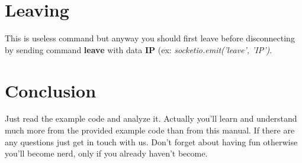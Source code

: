 \documentclass[10pt]{article}
\begin{document}
\section{Leaving}
This is useless command but anyway you should first leave before disconnecting by sending command \textbf{leave} with data \textbf{IP} (ex: \textit{socketio.emit('leave', 'IP')}.

\section{Conclusion}
Just read the example code and analyze it. Actually you'll learn and understand much more from the provided example code than from this manual. If there are any questions just get in touch with us. Don't forget about having fun otherwise you'll become nerd, only if you already haven't become.
\end{document}
